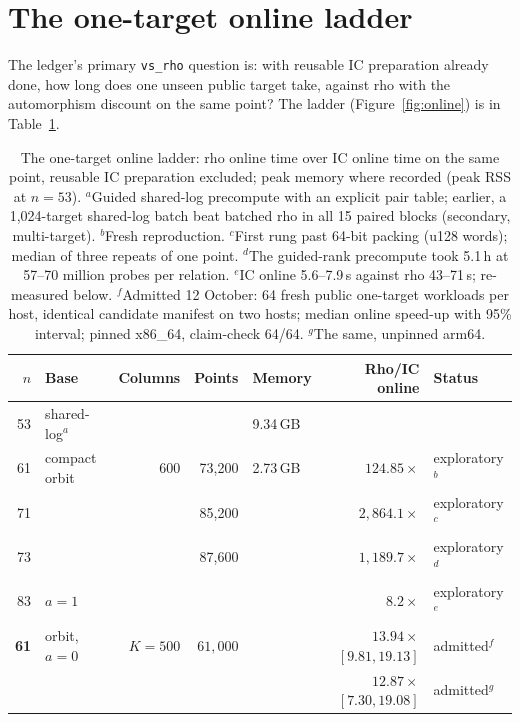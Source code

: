 \section{The one-target online ladder}

The ledger's primary \texttt{vs\_rho} question is: with reusable IC
preparation already done, how long does one unseen public target take,
against rho with the automorphism discount on the same point? The ladder
(Figure~\ref{fig:online}) is in Table~\ref{tab:prog_koblitz-ladder}.

\begin{table}[t]
\centering\small
\begin{tabular}{@{}rlrrlrl@{}}
\toprule
$n$ & Base & Columns & Points & Memory & Rho/IC online & Status \\
\midrule
53 & shared-log$^{a}$ & & & 9.34\,GB & & \\
61 & compact orbit & 600 & 73{,}200 & 2.73\,GB & $124.85\times$ & exploratory$^{b}$ \\
71 & & & 85{,}200 & & $2{,}864.1\times$ & exploratory$^{c}$ \\
73 & & & 87{,}600 & & $1{,}189.7\times$ & exploratory$^{d}$ \\
83 & $a=1$ & & & & $8.2\times$ & exploratory$^{e}$ \\
\addlinespace
\textbf{61} & orbit, $a=0$ & $K=500$ & $61{,}000$ & & $13.94\times$ $[9.81,19.13]$ & admitted$^{f}$ \\
 & & & & & $12.87\times$ $[7.30,19.08]$ & admitted$^{g}$ \\
\bottomrule
\end{tabular}
\caption[]{The one-target online ladder: rho online time over IC online
time on the same point, reusable IC preparation excluded; peak memory where
recorded (peak RSS at $n=53$). $^{a}$Guided shared-log precompute with an
explicit pair table; earlier, a 1{,}024-target shared-log batch beat batched rho
in all 15 paired blocks (secondary, multi-target). $^{b}$Fresh
reproduction. $^{c}$First rung past 64-bit packing (u128 words); median of three
repeats of one point. $^{d}$The guided-rank precompute took 5.1\,h at
57--70 million probes per relation. $^{e}$IC online 5.6--7.9\,s against
rho 43--71\,s; re-measured below. $^{f}$Admitted 12 October: 64 fresh
public one-target workloads per host, identical candidate manifest on two
hosts; median online speed-up with 95\% interval; pinned x86\_64,
claim-check 64/64. $^{g}$The same, unpinned arm64.}
\label{tab:prog_koblitz-ladder}
\end{table}

